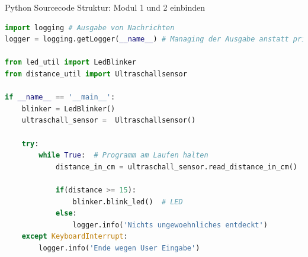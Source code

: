 \begin{frame}[fragile]{Python Sourcecode Struktur: Modul 1  und 2 einbinden}
\begin{lstlisting}[language=Python]
import logging # Ausgabe von Nachrichten
logger = logging.getLogger(__name__) # Managing der Ausgabe anstatt print() Funktion

from led_util import LedBlinker
from distance_util import Ultraschallsensor

if __name__ == '__main__':
    blinker = LedBlinker()
    ultraschall_sensor =  Ultraschallsensor()

    try:
        while True:  # Programm am Laufen halten
            distance_in_cm = ultraschall_sensor.read_distance_in_cm()

            if(distance >= 15):
                blinker.blink_led()  # LED
            else:
                logger.info('Nichts ungewoehnliches entdeckt')
    except KeyboardInterrupt:
        logger.info('Ende wegen User Eingabe')
\end{lstlisting}
\end{frame}




